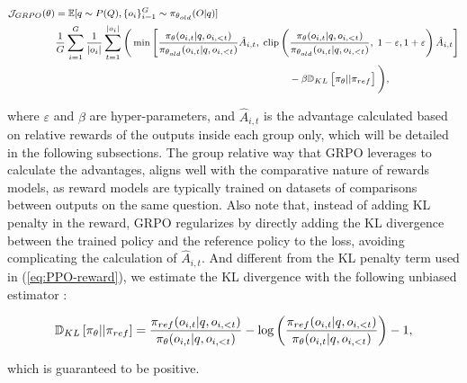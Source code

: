 \begin{itemize}[topsep=0pt]
\begin{equation}
\footnotesize
\begin{split}
    \mathcal{J}_{GRPO}(\theta) &= \mathbb{E}{[q \sim P(Q), \{o_i\}_{i=1}^G \sim \pi_{\theta_{old}}(O|q)]}  \\
    & \frac{1}{G}\sum_{i=1}^G\frac{1}{|o_i|} \sum_{t=1}^{|o_i|} \Bigg( \min \left[ \frac{\pi_\theta(o_{i,t} | q, o_{i,<t})}{\pi_{\theta_{old}}(o_{i,t} | q, o_{i,<t})} \hat{A}_{i,t},\; \text{clip} \left( \frac{\pi_\theta(o_{i,t} | q, o_{i,<t})}{\pi_{\theta_{old}}(o_{i,t} | q, o_{i,<t})},\; 1 - \varepsilon, 1 + \varepsilon \right)  \hat{A}_{i,t} \right] \\
    &\hspace{7cm} - \beta \mathbb{D}_{KL}\left[\pi_{\theta} || \pi_{ref}\right] \Bigg) ,
\end{split}
\label{eq:GRPO-obj}
\end{equation}

where $\varepsilon$ and $\beta$ are hyper-parameters, and $\hat{A}_{i,t}$  is the advantage calculated based on relative rewards of the outputs inside each group only, which will be detailed in the following subsections. The group relative way that GRPO leverages to calculate the advantages, aligns well with the comparative nature of rewards models,  as reward models are typically trained on datasets of comparisons between outputs on the same question. Also note that, instead of adding KL penalty in the reward, GRPO regularizes by directly adding the KL divergence between the trained policy and the reference policy to the loss, avoiding complicating the calculation of  $\hat{A}_{i,t}$. And different from the KL penalty term used in (\ref{eq:PPO-reward}), we estimate the KL divergence with the following unbiased estimator \citep{kl_approx}:

\begin{equation}
\small
    \mathbb{D}_{KL}\left[\pi_{\theta} || \pi_{ref}\right] = \frac{\pi_{ref}(o_{i,t}|q,o_{i,<t})}{\pi_{\theta}(o_{i,t}|q,o_{i,<t})} - \log\left(\frac{\pi_{ref}(o_{i,t}|q,o_{i,<t})}{\pi_{\theta}(o_{i,t}|q,o_{i,<t})}\right) - 1,
\end{equation}

which is guaranteed to be positive.


\end{itemize}
